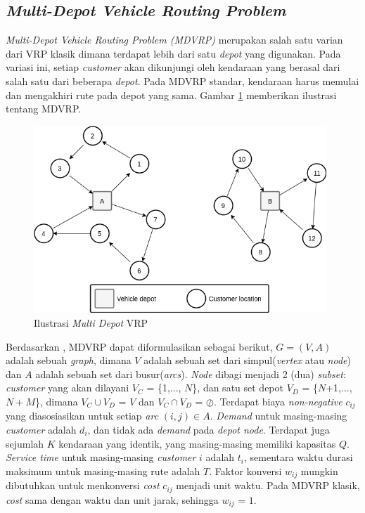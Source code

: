 \subsection{\textit{Multi-Depot Vehicle Routing Problem}}
\label{ssec:mdvrp}
\textit{Multi-Depot Vehicle Routing Problem (MDVRP)} merupakan salah satu varian dari VRP klasik dimana terdapat lebih dari satu \textit{depot} yang digunakan. Pada variasi ini, setiap \textit{customer} akan dikunjungi oleh kendaraan yang berasal dari salah satu dari beberapa \textit{depot}. Pada MDVRP standar, kendaraan harus memulai dan mengakhiri rute pada depot yang sama. Gambar \ref{fig:mdvrp-illustration} memberikan ilustrasi tentang MDVRP.


\begin{figure}[!]
	\centering
	\includegraphics[width=11cm]{Resources/Images/mdvrp-illustration}
	\captionsetup{format=hang}
	\caption{Ilustrasi \textit{Multi Depot} VRP}
	\label{fig:mdvrp-illustration}
\end{figure}


Berdasarkan \citep{renaud_tabu_1996}, MDVRP dapat diformulasikan sebagai berikut, $G = (V, A)$ adalah sebuah \textit{graph}, dimana $V$ adalah sebuah set dari simpul(\textit{vertex} atau \textit{node}) dan $A$ adalah sebuah set dari busur(\textit{arcs}). \textit{Node} dibagi menjadi 2 (dua) \textit{subset}: \textit{customer} yang akan dilayani $V_C$ = \{1,..., $N$\}, dan satu set depot $V_D$ = \{$N$+1,..., $N+M$\}, dimana $V_C \cup V_D$ = $V$ dan $V_C \cap V_D$ = $\oslash$. Terdapat biaya \textit{non-negative} $c_{ij}$ yang diasosiasikan untuk setiap \textit{arc} $(i, j) \in A$. \textit{Demand} untuk masing-masing \textit{customer} adalah $d_i$, dan tidak ada \textit{demand} pada \textit{depot node}. Terdapat juga sejumlah $K$ kendaraan yang identik, yang masing-masing memiliki kapasitas $Q$. \textit{Service time} untuk masing-masing \textit{customer} $i$ adalah $t_i$, sementara waktu durasi maksimum untuk masing-masing rute adalah $T$. Faktor konversi $w_{ij}$ mungkin dibutuhkan untuk menkonversi \textit{cost} $c_{ij}$ menjadi unit waktu. Pada MDVRP klasik, \textit{cost} sama dengan waktu dan unit jarak, sehingga $w_{ij}$ = $1$.


